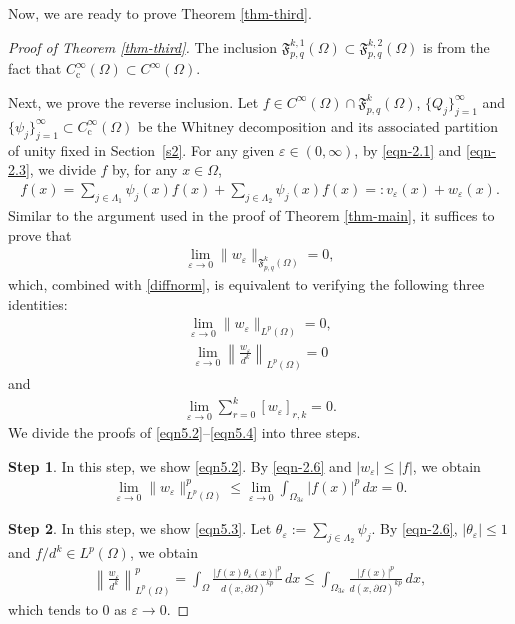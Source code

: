 \documentclass[11pt,twoside]{article}
\def\boz{{\Omega}}
\def\vez{\varepsilon}
\def\pa{\partial}                %
\theoremstyle{mylem}
\theoremstyle{definition}
\numberwithin{equation}{section}
\begin{document}
Now, we are ready to prove Theorem \ref{thm-third}.

\begin{proof}[Proof of Theorem \ref{thm-third}]
The inclusion
${\mathfrak F}^{k,1}_{p,q}(\boz)
\subset{\mathfrak F}^{k,2}_{p,q}(\boz)$
is from the fact that $C_{\mathrm c}^\infty(\Omega)\subset C^\infty(\boz)$. 

Next, we prove the reverse inclusion.
Let
$f\in C^\infty(\boz)\cap\mathfrak F^{k}_{p,q}(\boz)$,
$\{Q_j\}_{j=1}^\infty$ and $\{\psi_j\}_{j=1}^\infty\subset C_{\mathrm c}^\infty(\Omega)$ be the Whitney decomposition and its associated partition of unity fixed in Section~\ref{s2}. For any given \( \varepsilon\in(0,\infty)\), by \eqref{eqn-2.1} and \eqref{eqn-2.3}, we divide $f$ by, for any $x\in\Omega$,
\begin{align*}
f(x)= \sum_{j \in \Lambda_1} \psi_j(x) f(x) + \sum_{j \in \Lambda_2} \psi_j(x) f(x)
=: v_{\varepsilon}(x) + w_{\varepsilon}(x).
\end{align*}
Similar to the argument used in the proof of Theorem \ref{thm-main}, it suffices to  prove that
\begin{align}\label{eqn-integerw}
\lim_{\vez\to0}\|w_\vez\|_{\mathfrak F^{k}_{p,q}(\boz)}=0,
\end{align}
which, combined with \eqref{diffnorm}, is equivalent to verifying the following three identities:
\begin{align}\label{eqn5.2}
\lim_{\vez\to0}\|w_\vez\|_{L^p(\boz)}=0,
\end{align}
\begin{align}\label{eqn5.3}
\lim_{\vez\to0}\left\|\frac{w_\vez}{d^k}\right\|_{L^p(\boz)}=0
\end{align}
and
\begin{align}\label{eqn5.4}
\lim_{\vez\to0}\sum_{r=0}^k [w_\vez]_{r,k}=0.
\end{align}
We divide the proofs of \eqref{eqn5.2}--\eqref{eqn5.4} into three steps.

{\bf Step 1}. In this step, we show \eqref{eqn5.2}.
By \eqref{eqn-2.6} and $|w_\vez|\le |f|$, we obtain
\begin{align*}
\lim_{\vez\to0}\|w_\vez\|_{L^p(\boz)}^p
\le
\lim_{\vez\to0}\int_{\boz_{3\vez}} |f(x)|^p\,dx
=0.
\end{align*}

{\bf Step 2}. In this step, we show \eqref{eqn5.3}. Let $\theta_\vez:=\sum_{j \in \Lambda_2} \psi_j$.
By \eqref{eqn-2.6}, $|\theta_\vez|\le1$ and $f/d^k\in L^p(\boz)$, we obtain
\begin{align*}
\left\|\frac{w_\vez}{d^k}\right\|_{L^p(\boz)}^p
=
\int_{\boz}\frac{|f(x)\theta_\vez(x)|^p}{d(x,\pa\boz)^{kp}}\,dx
\le
\int_{\boz_{3\vez}}\frac{|f(x)|^p}{d(x,\pa\boz)^{kp}}\,dx,
\end{align*}
which tends to $0$ as $\vez\to0$.


\end{proof}
\end{document}
